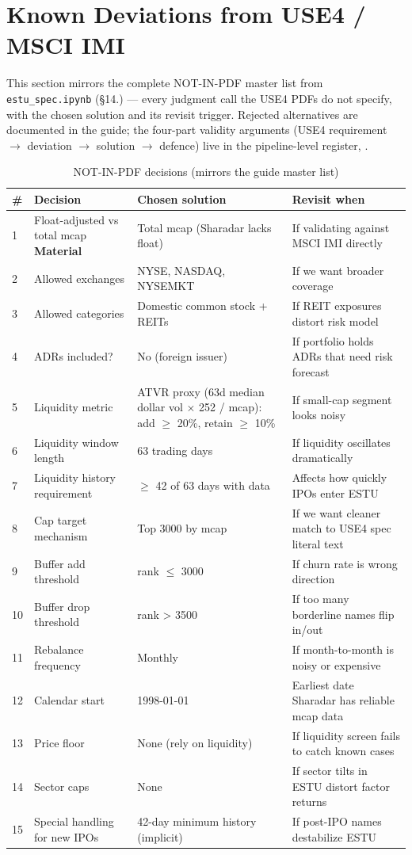 \documentclass[11pt,a4paper]{article}
\newcommand{\WARN}[1]{\textcolor{warn}{\textbf{#1}}}
\begin{document}
\section{Known Deviations from USE4 / MSCI IMI}

This section mirrors the complete NOT-IN-PDF master list from
\texttt{estu\_spec.ipynb} (\S14.) --- every judgment call the USE4 PDFs do not
specify, with the chosen solution and its revisit trigger. Rejected alternatives
are documented in the guide; the four-part validity arguments (USE4 requirement
$\to$ deviation $\to$ solution $\to$ defence) live in the pipeline-level
register, .

\begin{longtable}{@{}p{0.5cm}p{3.6cm}p{6.0cm}p{3.8cm}@{}}
\caption{NOT-IN-PDF decisions (mirrors the guide master list)}\\
\toprule
\textbf{\#} & \textbf{Decision} & \textbf{Chosen solution} & \textbf{Revisit when} \\
\midrule
\endhead
1 & Float-adjusted vs total mcap \WARN{Material} & Total mcap (Sharadar lacks float) & If validating against MSCI IMI directly \\[3pt]
2 & Allowed exchanges & NYSE, NASDAQ, NYSEMKT & If we want broader coverage \\[3pt]
3 & Allowed categories & Domestic common stock + REITs & If REIT exposures distort risk model \\[3pt]
4 & ADRs included? & No (foreign issuer) & If portfolio holds ADRs that need risk forecast \\[3pt]
5 & Liquidity metric & ATVR proxy (63d median dollar vol $\times$ 252 / mcap): add $\geq$ 20\%, retain $\geq$ 10\% & If small-cap segment looks noisy \\[3pt]
6 & Liquidity window length & 63 trading days & If liquidity oscillates dramatically \\[3pt]
7 & Liquidity history requirement & $\geq$ 42 of 63 days with data & Affects how quickly IPOs enter ESTU \\[3pt]
8 & Cap target mechanism & Top 3000 by mcap & If we want cleaner match to USE4 spec literal text \\[3pt]
9 & Buffer add threshold & rank $\leq$ 3000 & If churn rate is wrong direction \\[3pt]
10 & Buffer drop threshold & rank > 3500 & If too many borderline names flip in/out \\[3pt]
11 & Rebalance frequency & Monthly & If month-to-month is noisy or expensive \\[3pt]
12 & Calendar start & 1998-01-01 & Earliest date Sharadar has reliable mcap data \\[3pt]
13 & Price floor & None (rely on liquidity) & If liquidity screen fails to catch known cases \\[3pt]
14 & Sector caps & None & If sector tilts in ESTU distort factor returns \\[3pt]
15 & Special handling for new IPOs & 42-day minimum history (implicit) & If post-IPO names destabilize ESTU \\[3pt]
\bottomrule
\end{longtable}
\end{document}

